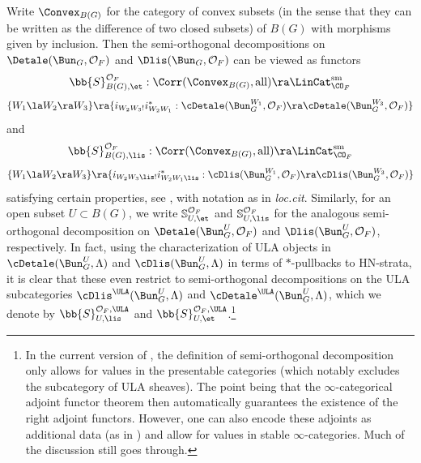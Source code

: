 \documentclass[letterpaper,11pt]{amsart}
\begin{document}
Write $\Convex_{B(G)}$ for the category of convex subsets (in the sense that they can be written as the difference of two closed subsets) of $B(G)$ with morphisms given by inclusion. Then the semi-orthogonal decompositions on $\Detale(\Bun_{G},\mathcal{O}_{F})$ and $\Dlis(\Bun_{G},\mathcal{O}_{F})$ can be viewed as functors
\begin{equation}{\label{eqn: DetaleSemiOrthogonalDecomp}}
\bb{S}^{\mathcal{O}_{F}}_{B(G),\et}: \Corr(\Convex_{B(G)},\mathrm{all}) \ra \LinCat_{\CO_F}^{\mathrm{sm}}
\end{equation}
\[ \{W_{1} \la W_{2} \ra W_{3}\} \ra \{ i_{W_{2}W_{3}!}i_{W_{2}W_{1}}^{*}: \cDetale(\Bun_{G}^{W_{1}},\mathcal{O}_{F}) \ra \cDetale(\Bun_{G}^{W_{3}},\mathcal{O}_{F})\} \]
and 
\begin{equation}{\label{eqn: DlisSemiOrthogonalDecomp}}
 \bb{S}^{\mathcal{O}_{F}}_{B(G),\lis}: \Corr(\Convex_{B(G)},\mathrm{all}) \ra \LinCat^{\mathrm{sm}}_{\CO_F}
\end{equation}
\[ \{W_{1} \la W_{2} \ra W_{3}\} \ra \{ i_{W_{2}W_{3}\lis!}i_{W_{2}W_{1}\lis}^{*}: \cDlis(\Bun_{G}^{W_{1}},\mathcal{O}_{F}) \ra \cDlis(\Bun_{G}^{W_{3}},\mathcal{O}_{F})\} \]
satisfying certain properties, see \cite[Definition~6.2.1]{GHILZIsocComparison}, with notation as in \emph{loc.cit}. Similarly, for an open subset $U \subset B(G)$, we write $\mathbb{S}^{\mathcal{O}_{F}}_{U,\et}$ and $\mathbb{S}^{\mathcal{O}_{F}}_{U,\lis}$ for the analogous semi-orthogonal decomposition on $\Detale(\Bun_{G}^{U},\mathcal{O}_{F})$ and $\Dlis(\Bun_{G}^U,\mathcal{O}_{F})$, respectively. In fact, using the characterization of ULA objects in $\cDetale(\Bun_{G}^{U},\Lambda)$ and $\cDlis(\Bun_{G}^{U},\Lambda)$ in terms of $*$-pullbacks to HN-strata, it is clear that these even restrict to semi-orthogonal decompositions on the ULA subcategories $\cDlis^{\ULA}(\Bun_{G}^{U},\Lambda)$ and $\cDetale^{\ULA}(\Bun_{G}^{U},\Lambda)$, which we denote by $\bb{S}_{U,\lis}^{\mathcal{O}_{F},\ULA}$ and $\bb{S}_{U,\et}^{\mathcal{O}_{F},\ULA}$.\footnote{In the current version of \cite{GHILZIsocComparison}, the definition of semi-orthogonal decomposition only allows for values in the presentable categories (which notably excludes the subcategory of ULA sheaves). The point being that the $\infty$-categorical adjoint functor theorem then automatically guarantees the existence of the right adjoint functors. However, one can also encode these adjoints as additional data (as in \cite[Definition~3.2.1]{HeyerMann}) and allow for values in stable $\infty$-categories. Much of the discussion still goes through.} 
\end{document}
